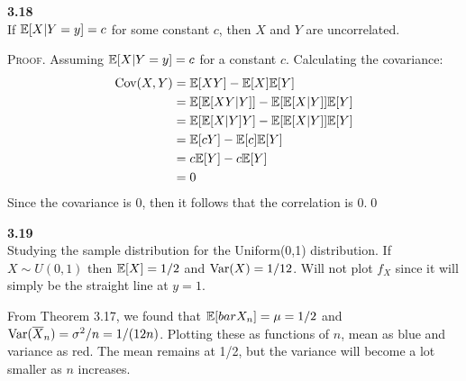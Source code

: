 \newpage\noindent
\textbf{3.18}\\  %
If $\mathbb{E}[X|Y = y] = c$ for some constant $c$, then $X$ and $Y$ are uncorrelated.

\medskip\noindent\textsc{Proof}. Assuming $\mathbb{E}[X|Y = y] = c$ for a constant $c$.
Calculating the covariance:
\begin{align*}
    \text{Cov}(X, Y) &= \mathbb{E}[XY] - \mathbb{E}[X]\mathbb{E}[Y] \\
    &= \mathbb{E}[\mathbb{E}[XY|Y]] - \mathbb{E}[\mathbb{E}[X|Y]]\mathbb{E}[Y] \\
    &= \mathbb{E}[\mathbb{E}[X|Y]Y] - \mathbb{E}[\mathbb{E}[X|Y]]\mathbb{E}[Y] \\
    &= \mathbb{E}[cY] - \mathbb{E}[c]\mathbb{E}[Y]\\
    &= c\mathbb{E}[Y] - c\mathbb{E}[Y] \\
    &= 0
\end{align*}
Since the covariance is 0, then it follows that the correlation is 0.\qed

\bigskip\noindent
\textbf{3.19}\\  %
Studying the sample distribution for the Uniform(0,1) distribution. If $X\sim U(0,1)$
then $\mathbb{E}[X] = 1/2$ and $\text{Var}(X) = 1/12$. Will not plot $f_X$ since it will simply be
the straight line at $y=1$.

From Theorem 3.17, we found that $\mathbb{E}[bar{X}_n] = \mu = 1/2$ and
$\text{Var}(\overline{X}_n) = \sigma^2/n = 1/(12n)$. Plotting these as functions of $n$,
mean as blue and variance as red. The mean remains at 1/2, but the variance
will become a lot smaller as $n$ increases.


    
